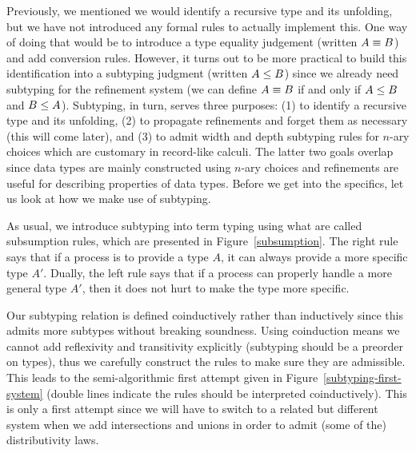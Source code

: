 \documentclass[a4paper,USenglish]{lipics-v2016}
\begin{document}
Previously, we mentioned we would identify a recursive type and its unfolding, but we have not introduced any formal rules to actually implement this. One way of doing that would be to introduce a type equality judgement (written $A \equiv B$) and add conversion rules. However, it turns out to be more practical to build this identification into a subtyping judgment (written $A \le B$) since we already need subtyping for the refinement system (we can define $A \equiv B$ if and only if $A \le B$ and $B \le A$). Subtyping, in turn, serves three purposes: (1) to identify a recursive type and its unfolding, (2) to propagate refinements and forget them as necessary (this will come later), and (3) to admit width and depth subtyping rules for $n$-ary choices which are customary in record-like calculi. The latter two goals overlap since data types are mainly constructed using $n$-ary choices and refinements are useful for describing properties of data types. Before we get into the specifics, let us look at how we make use of subtyping.

As usual, we introduce subtyping into term typing using what are called subsumption rules, which are presented in Figure~\ref{subsumption}. The right rule says that if a process is to provide a type $A$, it can always provide a more specific type $A'$. Dually, the left rule says that if a process can properly handle a more general type $A'$, then it does not hurt to make the type more specific.


Our subtyping relation is defined coinductively rather than inductively since this admits more subtypes without breaking soundness. Using coinduction means we cannot add reflexivity and transitivity explicitly (subtyping should be a preorder on types), thus we carefully construct the rules to make sure they are admissible. This leads to the semi-algorithmic first attempt given in Figure~\ref{subtyping-first-system} (double lines indicate the rules should be interpreted coinductively). This is only a first attempt since we will have to switch to a related but different system when we add intersections and unions in order to admit (some of the) distributivity laws. 
\end{document}
